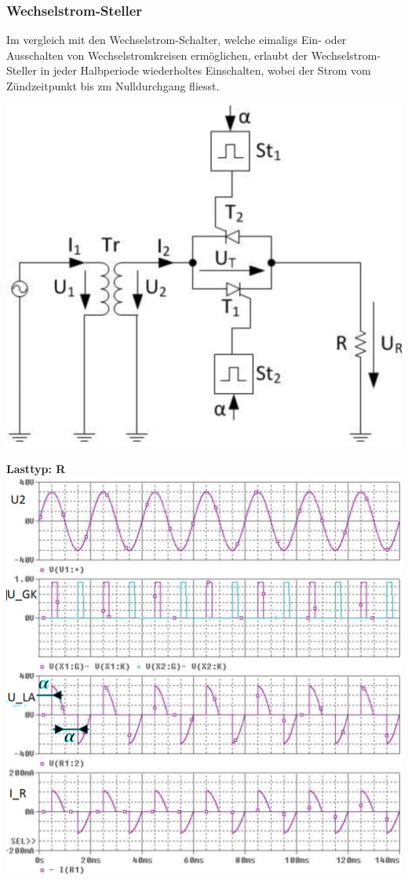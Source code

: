 \subsubsection{Wechselstrom-Steller}
\begin{minipage}{\linewidth}
    Im vergleich mit den Wechselstrom-Schalter, welche eimaligs Ein- oder Ausschalten von Wechselstromkreisen ermöglichen, erlaubt der Wechselstrom-Steller in jeder Halbperiode wiederholtes Einschalten, wobei der Strom vom Zündzeitpunkt bis zm Nulldurchgang fliesst.
\end{minipage}

\begin{minipage}{0.3\linewidth}
    \includegraphics[width=\linewidth]{images/SchemaWSSteller}
\end{minipage}
\begin{minipage}{0.3\linewidth}
    \textbf{Lasttyp: R}\newline
    \includegraphics[width=\linewidth]{images/KLWSSteller}
\end{minipage}
